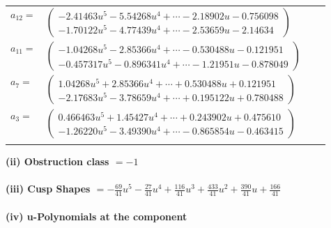 \documentclass[1p]{elsarticle_modified}
\theoremstyle{definition}
\begin{document}
\begin{tabular}{m{7pt} m{180pt} m{7pt} m{180pt} }
\flushright $a_{12}=$&$\begin{pmatrix}-2.41463 u^{5}-5.54268 u^{4}+\cdots-2.18902 u-0.756098\\-1.70122 u^{5}-4.77439 u^{4}+\cdots-2.53659 u-2.14634\end{pmatrix}$ \\
\flushright $a_{11}=$&$\begin{pmatrix}-1.04268 u^{5}-2.85366 u^{4}+\cdots-0.530488 u-0.121951\\-0.457317 u^{5}-0.896341 u^{4}+\cdots-1.21951 u-0.878049\end{pmatrix}$ \\
\flushright $a_{7}=$&$\begin{pmatrix}1.04268 u^{5}+2.85366 u^{4}+\cdots+0.530488 u+0.121951\\-2.17683 u^{5}-3.78659 u^{4}+\cdots+0.195122 u+0.780488\end{pmatrix}$ \\
\flushright $a_{3}=$&$\begin{pmatrix}0.466463 u^{5}+1.45427 u^{4}+\cdots+0.243902 u+0.475610\\-1.26220 u^{5}-3.49390 u^{4}+\cdots-0.865854 u-0.463415\end{pmatrix}$\\&\end{tabular}
\flushleft \textbf{(ii) Obstruction class $= -1$}\\~\\
\flushleft \textbf{(iii) Cusp Shapes $= -\frac{69}{41} u^5-\frac{27}{41} u^4+\frac{116}{41} u^3+\frac{433}{41} u^2+\frac{390}{41} u+\frac{166}{41}$}\\~\\
\newpage\renewcommand{\arraystretch}{1}
\flushleft \textbf{(iv) u-Polynomials at the component}\newline \\
\end{document}
